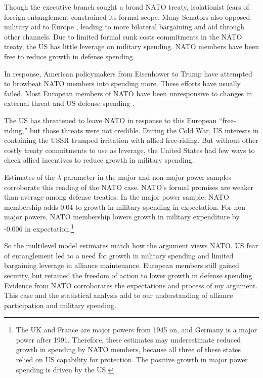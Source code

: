 \documentclass[12pt]{article}
\begin{document}
Though the executive branch sought a broad NATO treaty, isolationist fears of foreign entanglement constrained its formal scope. 
Many Senators also opposed military aid to Europe \citep[pg 285]{Acheson1969}, leading to more bilateral bargaining and aid through other channels. 
Due to limited formal sunk costs commitments in the NATO treaty, the US has little leverage on military spending. 
NATO members have been free to reduce growth in defense spending. 


In response, American policymakers from Eisenhower to Trump have attempted to browbeat NATO members into spending more. 
These efforts have usually failed. 
Most European members of NATO have been unresponsive to changes in external threat and US defense spending \citep{PluemperNeumayer2015}. 


The US has threatened to leave NATO in response to this European ``free-riding,'' but those threats were not credible. 
During the Cold War, US interests in containing the USSR trumped irritation with allied free-riding.  
But without other costly treaty commitments to use as leverage, the United States had few ways to check allied incentives to reduce growth in military spending. 


Estimates of the $\lambda$ parameter in the major and non-major power samples corroborate this reading of the NATO case. 
NATO's formal promises are weaker than average among defense treaties. 
In the major power sample, NATO membership adds 0.04 to growth in military spending in expectation.
For non-major powers, NATO membership lowers growth in military expenditure by -0.006 in expectation.\footnote{
The UK and France are major powers from 1945 on, and Germany is a major power after 1991. Therefore, these estimates may underestimate reduced growth in spending by NATO members, because all three of these states relied on US capability for protection. The positive growth in major power spending is driven by the US.}


So the multilevel model estimates match how the argument views NATO.
US fear of entanglement led to a need for growth in military spending and limited bargaining leverage in alliance maintenance. 
European members still gained security, but retained the freedom of action to lower growth in defense spending.   
Evidence from NATO corroborates the expectations and process of my argument. 
This case and the statistical analysis add to our understanding of alliance participation and military spending. 
\end{document}
